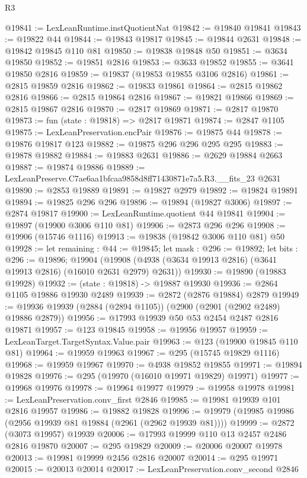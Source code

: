 \begin{lexlean}{R3}
\begin{coremodule}
@19841 := LexLeanRuntime.instQuotientNat
@19842 := @19840 @19841
@19843 := @19822 @44
@19844 := @19843 @19817
@19845 := @19844 @2631
@19848 := @19842 @19845 @110 @81
@19850 := @19838 @19848 @50
@19851 := @3634 @19850
@19852 := @19851 @2816
@19853 := @3633 @19852
@19855 := @3641 @19850 @2816
@19859 := @19837 (@19853 @19855 @3106 @2816)
@19861 := @2815 @19859 @2816
@19862 := @19833 @19861
@19864 := @2815 @19862 @2816
@19866 := @2815 @19864 @2816
@19867 := @19821 @19866
@19869 := @2815 @19867 @2816
@19870 := @2817 @19869
@19871 := @2817 @19870
@19873 := fun (state : @19818) => @2817 @19871
@19874 := @2847 @1105
@19875 := LexLeanPreservation.encPair
@19876 := @19875 @44
@19878 := @19876 @19817 @123
@19882 := @19875 @296 @296 @295 @295
@19883 := @19878 @19882
@19884 := @19883 @2631
@19886 := @2629 @19884 @2663
@19887 := @19874 @19886
@19889 := LexLeanPreserve.C7ae6aa1bfcaa9858d8ff71430871e7a5.R3.__fits_23 @2631
@19890 := @2853 @19889
@19891 := @19827 @2979
@19892 := @19824 @19891
@19894 := @19825 @296 @296
@19896 := @19894 (@19827 @3006)
@19897 := @2874 @19817
@19900 := LexLeanRuntime.quotient @44 @19841
@19904 := @19897 (@19900 @3006 @110 @81)
@19906 := @2873 @296 @296
@19908 := @19906 (@15746 @1116)
@19913 := @19838 (@19842 @3006 @110 @81) @50
@19928 := let remaining : @44 := @19845;
  let mask : @296 := @19892;
  let bits : @296 := @19896;
  @19904 (@19908 (@4938 (@3634 @19913 @2816) (@3641 @19913 @2816) (@16010 @2631 @2979) @2631))
@19930 := @19890 (@19883 @19928)
@19932 := (state : @19818) -> @19887 @19930
@19936 := @2864 @1105 @19886 @19930 @2489
@19939 := @2872 (@2876 @19884) @2879
@19949 := @19936 @19939 (@2884 (@2894 @1105)) (@2900 (@2901 (@2902 @2489) @19886 @2879))
@19956 := @17993 @19939 @50 @53 @2454 @2487 @2816 @19871
@19957 := @123 @19845
@19958 := @19956 @19957
@19959 := LexLeanTarget.TargetSyntax.Value.pair
@19963 := @123 (@19900 @19845 @110 @81)
@19964 := @19959 @19963
@19967 := @295 (@15745 @19829 @1116)
@19968 := @19959 @19967
@19970 := @4938 @19852 @19855
@19971 := @19894 @19828
@19976 := @295 (@19970 (@16010 @19971 @19829) @19971)
@19977 := @19968 @19976
@19978 := @19964 @19977
@19979 := @19958 @19978
@19981 := LexLeanPreservation.conv_first @2846
@19985 := @19981 @19939 @101 @2816 @19957
@19986 := @19882 @19828
@19996 := @19979 (@19985 @19986 (@2956 @19939 @81 @19884 (@2961 (@2962 @19939 @81))))
@19999 := @2872 (@3073 @19957) @19939
@20006 := @17993 @19999 @110 @13 @2457 @2486 @2816 @19870
@20007 := @295 @19829
@20009 := @20006 @20007 @19978
@20013 := @19981 @19999 @2456 @2816 @20007
@20014 := @295 @19971
@20015 := @20013 @20014
@20017 := LexLeanPreservation.conv_second @2846

\end{coremodule}
\end{lexlean}

